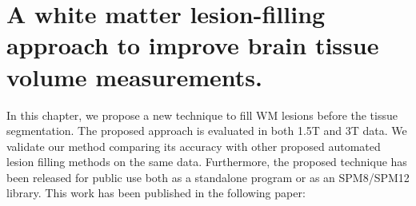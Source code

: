 
\chapter{A white matter lesion-filling approach to improve brain tissue volume measurements.}

\label{chapter:chapter_4}

In this chapter, we propose a new technique to fill WM lesions before the tissue segmentation. The proposed approach is evaluated in both 1.5T and 3T data. We validate our method comparing its accuracy with other proposed automated lesion filling methods on the same data. Furthermore, the proposed technique has been released for public use both as a standalone program or as an SPM8/SPM12 library.  
This work has been published in the following paper:

\vspace{2cm}

\noindent{}




